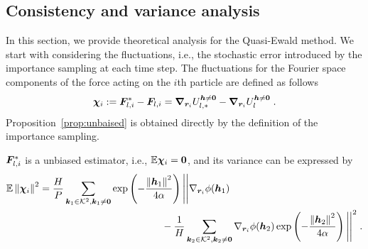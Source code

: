 \subsection{Consistency and variance analysis}
In this section, we provide theoretical analysis for the Quasi-Ewald method. We start with considering the fluctuations, i.e., the stochastic error introduced by the importance sampling at each time step.
The fluctuations for the Fourier space components of   the force acting on the $i$th particle are defined as follows 
\begin{equation}\label{eq::xichi}
    \boldsymbol{\chi}_{i} :=\bm{F}_{l,i}^*-\bm{F}_{l,i}=\boldsymbol{\nabla}_{\boldsymbol{r}_i} U_{l,\ast}^{\boldsymbol{h}\neq \bm{0}}-\boldsymbol{\nabla}_{\boldsymbol{r}_i} U_{l}^{\boldsymbol{h}\neq \bm{0}}\;.
\end{equation}
Proposition~\ref{prop:unbaised} is obtained directly by the definition of the importance sampling.
\begin{prop}\label{prop:unbaised}
	  $\bm{F}_{l,i}^*$ is a  unbiased estimator, i.e.,  $\mathbb{E} \boldsymbol{\chi}_{i} = \bm 0$, and its variance  can be expressed by
\begin{align*}
		\mathbb{E}\left\lVert\boldsymbol{\chi}_{i}\right\rVert^2&=\frac{H}{P}\sum_{\bm{k}_1\in\mathcal{K}^2, \bm{k}_1\neq \bm{0}}\exp\left(-\frac{\left\lVert\boldsymbol{h}_1\right\rVert^2}{4\alpha}\right)\Bigg|\Bigg|\nabla_{\bm{r}_i}\phi(\boldsymbol{h}_1)\\
        &~~~~~~~~~~~~~~~~~~~~~~~~~~~~~~~~~~~~~-\frac{1}{H} \sum_{\bm{k}_2\in\mathcal{K}^2, \bm{k}_2\neq \bm{0}}\nabla_{\bm{r}_i}\phi(\boldsymbol{h}_2)\exp\left(-\frac{\left\lVert\boldsymbol{h}_2\right\rVert^2}{4\alpha}\right)\Bigg|\Bigg|^2\;.
\end{align*}
\end{prop}
